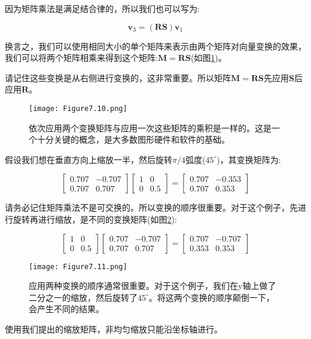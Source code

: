 因为矩阵乘法是满足结合律的，所以我们也可以写为:

\begin{equation}
	\mathbf{v}_3=(\mathbf{R S}) \mathbf{v}_1
	\nonumber
\end{equation}

换言之，我们可以使用相同大小的单个矩阵来表示由两个矩阵对向量变换的效果，我们可以将两个矩阵相乘来得到这个矩阵:$\mathbf{M}=\mathbf{R S}$(如图\ref{fig:7.10})。

请记住这些变换是从右侧进行变换的，这非常重要。所以矩阵$\mathbf{M}=\mathbf{R S}$先应用$\mathbf{S}$后应用$\mathbf{R}$。

\begin{figure}[htbp]
	\centering
	\texttt{[image: Figure7.10.png]}
	\caption{依次应用两个变换矩阵与应用一次这些矩阵的乘积是一样的。这是一个十分关键的概念，是大多数图形硬件和软件的基础。}
	\label{fig:7.10}
\end{figure}	

\begin{example}
	假设我们想在垂直方向上缩放一半，然后旋转$\pi/4$弧度($45^{\circ}$)，其变换矩阵为:
	
	\begin{equation}
		\left[\begin{array}{cr}
			0.707 & -0.707 \\
			0.707 & 0.707
		\end{array}\right]\left[\begin{array}{cc}
			1 & 0 \\
			0 & 0.5
		\end{array}\right]=\left[\begin{array}{cc}
			0.707 & -0.353 \\
			0.707 & 0.353
		\end{array}\right]
	\nonumber
	\end{equation}

请务必记住矩阵乘法不是可交换的。所以变换的顺序很重要。对于这个例子，先进行旋转再进行缩放，是不同的变换矩阵(如图\ref{fig:7.11}):

\begin{equation}
	\left[\begin{array}{cc}
		1 & 0 \\
		0 & 0.5
	\end{array}\right]\left[\begin{array}{cr}
		0.707 & -0.707 \\
		0.707 & 0.707
	\end{array}\right]=\left[\begin{array}{rr}
		0.707 & -0.707 \\
		0.353 & 0.353
	\end{array}\right]
\nonumber
\end{equation}

\begin{figure}[htbp]
	\centering
	\texttt{[image: Figure7.11.png]}
	\caption{应用两种变换的顺序通常很重要。对于这个例子，我们在y轴上做了二分之一的缩放，然后旋转了$45^{\circ}$。将这两个变换的顺序颠倒一下，会产生不同的结果。}
	\label{fig:7.11}
\end{figure}	

\end{example}

\begin{example}
	使用我们提出的缩放矩阵，非均匀缩放只能沿坐标轴进行。
	
	
	
\end{example}

